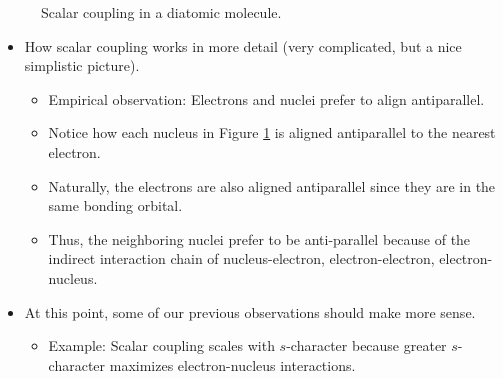\documentclass[../notes.tex]{subfiles}
\begin{document}
\begin{itemize}
    \begin{figure}[H]
        \centering
        \caption{Scalar coupling in a diatomic molecule.}
        \label{fig:scalarCouplingDiatomic}
    \end{figure}
    \begin{itemize}
        \item How scalar coupling works in more detail (very complicated, but a nice simplistic picture).
        \begin{itemize}
            \item Empirical observation: Electrons and nuclei prefer to align antiparallel.
            \item Notice how each nucleus in Figure \ref{fig:scalarCouplingDiatomic} is aligned antiparallel to the nearest electron.
            \item Naturally, the electrons are also aligned antiparallel since they are in the same bonding orbital.
            \item Thus, the neighboring nuclei prefer to be anti-parallel because of the indirect interaction chain of nucleus-electron, electron-electron, electron-nucleus.
        \end{itemize}
        \item At this point, some of our previous observations should make more sense.
        \begin{itemize}
            \item Example: Scalar coupling scales with $s$-character because greater $s$-character maximizes electron-nucleus interactions.
        \end{itemize}

\end{itemize}
\end{itemize}
\end{document}
